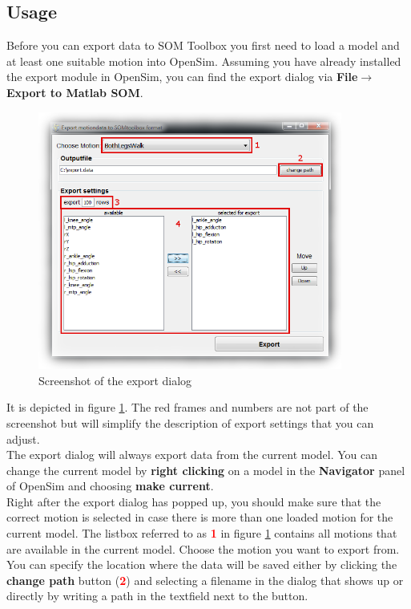 \documentclass[a4paper]{scrartcl}
\newcommand{\imagenumber}[1]{\textcolor{red}{\textbf{#1}}}
\begin{document}
\subsection{Usage}
Before you can export data to SOM Toolbox you first need to load a model and at least one suitable motion into OpenSim.
Assuming you have already installed the export module in OpenSim, you can find the export dialog via \textbf{File}$\rightarrow$\textbf{Export to Matlab SOM}.
\begin{figure}
\label{fig:som-export}
\centering
\includegraphics[width=10cm]{graphics/screen_exporter_1.png}
\caption{Screenshot of the export dialog}
\end{figure}
It is depicted in figure \ref{fig:som-export}. The red frames and numbers are not part of the screenshot but will simplify the description of export settings that you can adjust. \\
The export dialog will always export data from the current model. You can change the current model by \textbf{right clicking} on a model in the \textbf{Navigator} panel of OpenSim and choosing \textbf{make current}.\\
Right after the export dialog has popped up, you should make sure that the correct motion is selected in case there is more than one loaded motion for the current model. The listbox referred to as \imagenumber{1} in figure \ref{fig:som-export} contains all motions that are available in the current model. Choose the motion you want to export from.\\
You can specify the location where the data will be saved either by clicking the \textbf{change path} button (\imagenumber{2}) and selecting a filename in the dialog that shows up or directly by writing a path in the textfield next to the button.\\
\end{document}
